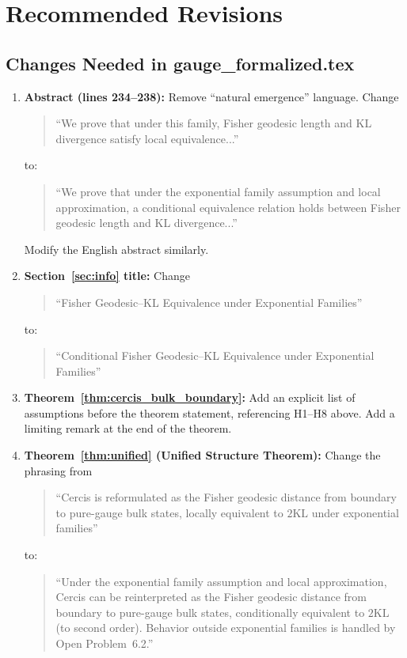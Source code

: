 \documentclass{article}
\newcommand{\KL}{\mathrm{KL}}
\begin{document}
\section{Recommended Revisions}

\subsection{Changes Needed in gauge\_formalized.tex}

\begin{enumerate}[label=(\arabic*)]

    \item \textbf{Abstract (lines 234--238):}
    Remove ``natural emergence'' language. Change
    \begin{quote}
        ``We prove that under this family, Fisher geodesic length and KL divergence satisfy local equivalence...''
    \end{quote}
    to:
    \begin{quote}
        ``We prove that under the exponential family assumption and local approximation, a conditional equivalence relation holds between Fisher geodesic length and KL divergence...''
    \end{quote}
    Modify the English abstract similarly.

    \item \textbf{Section~\ref{sec:info} title:}
    Change
    \begin{quote}
        ``Fisher Geodesic--KL Equivalence under Exponential Families''
    \end{quote}
    to:
    \begin{quote}
        ``Conditional Fisher Geodesic--KL Equivalence under Exponential Families''
    \end{quote}

    \item \textbf{Theorem~\ref{thm:cercis_bulk_boundary}:}
    Add an explicit list of assumptions before the theorem statement, referencing H1--H8 above. Add a limiting remark at the end of the theorem.

    \item \textbf{Theorem~\ref{thm:unified} (Unified Structure Theorem):}
    Change the phrasing from
    \begin{quote}
        ``Cercis is reformulated as the Fisher geodesic distance from boundary to pure-gauge bulk states, locally equivalent to $2\KL$ under exponential families''
    \end{quote}
    to:
    \begin{quote}
        ``Under the exponential family assumption and local approximation, Cercis can be reinterpreted as the Fisher geodesic distance from boundary to pure-gauge bulk states,
        conditionally equivalent to $2\KL$ (to second order). Behavior outside exponential families is handled by Open Problem~6.2.''
    \end{quote}


\end{enumerate}
\end{document}
